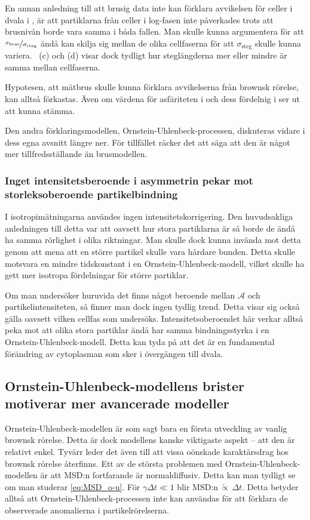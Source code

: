En annan anledning till att brusig data inte kan förklara avvikelsen för celler i dvala i , är att partiklarna från celler i log-fasen inte påverkades trots att brusnivån borde vara samma i båda fallen. Man skulle kunna argumentera för att $\nicefrac{\sigma_\text{brus}}{\sigma_\text{steg}}$ ändå kan skilja sig mellan de olika cellfaserna för att $\sigma_\text{steg}$ skulle kunna variera. ~(c) och (d) visar dock tydligt hur steglängderna mer eller mindre är samma mellan cellfaserna.

Hypotesen, att mätbrus skulle kunna förklara avvikelserna från brownsk rörelse, kan alltså förkastas. Även om värdena för asfäriteten i  och dess fördelnig i  ser ut att kunna stämma. 

Den andra förklaringsmodellen, Ornstein-Uhlenbeck-processen, diskuteras vidare i dess egna avsnitt längre ner. För tillfället räcker det att säga att den är något mer tillfredsställande än brusmodellen. 


\subsubsection{Inget intensitetsberoende i asymmetrin pekar mot storleksoberoende partikelbindning}
I isotropimätningarna användes ingen intensitetskorrigering. Den huvudsakliga anledningen till detta var att oavsett hur stora partiklarna är så borde de ändå ha samma rörlighet i olika riktningar. Man skulle dock kunna invända mot detta genom att mena att en större partikel skulle vara hårdare bunden. Detta skulle motsvara en mindre tidskonstant i en Ornstein-Uhlenbeck-modell, vilket skulle ha gett mer isotropa fördelningar för större partiklar.

Om man undersöker huruvida det finns något beroende mellan $\mathcal{A}$ och partikelintensiteten, så finner man dock ingen tydlig trend. Detta visar sig också gälla oavsett vilken cellfas som undersöks.
Intensitetsoberoendet här verkar alltså peka mot att olika stora partiklar ändå har samma bindningsstyrka i en Ornstein-Uhlenbeck-modell. 
Detta kan tyda på att det är en fundamental förändring av cytoplasman som sker i övergången till dvala.



\subsection{Ornstein-Uhlenbeck-modellens brister motiverar mer avancerade modeller}
Ornstein-Uhlenbeck-modellen är som sagt bara en första utveckling av vanlig brownsk rörelse. Detta är dock modellens kanske viktigaste aspekt -- att den är relativt enkel.
Tyvärr leder det även till att vissa oönskade karaktärsdrag hos brownsk rörelse återfinns. Ett av de största problemen med Ornstein-Uhlenbeck-modellen är att MSD:n fortfarande är normaldiffusiv. Detta kan man tydligt se om man studerar \eqref{eq:MSD_o-u}. För $\gamma\Delta{t}\ll 1$ blir $\text{MSD:n}\,\widetilde{\propto}\,\Delta{t}$.
Detta betyder alltså att Ornstein-Uhlenbeck-processen inte kan användas för att förklara de observerade anomalierna i partikelrörelserna. 

